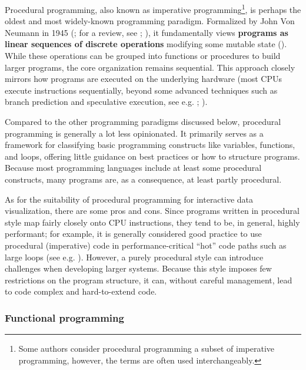 \documentclass[
  openany]{book}
\theoremstyle{definition}
\theoremstyle{definition}
\theoremstyle{definition}
\theoremstyle{definition}
\theoremstyle{remark}
\begin{document}
Procedural programming, also known as imperative programming\footnote{Some authors consider procedural programming a subset of imperative programming, however, the terms are often used interchangeably.}, is perhaps the oldest and most widely-known programming paradigm. Formalized by John Von Neumann in 1945 (; for a review, see ; ), it fundamentally views \textbf{programs as linear sequences of discrete operations} modifying some mutable state (). While these operations can be grouped into functions or procedures to build larger programs, the core organization remains sequential. This approach closely mirrors how programs are executed on the underlying hardware (most CPUs execute instructions sequentially, beyond some advanced techniques such as branch prediction and speculative execution, see e.g. ; ).

Compared to the other programming paradigms discussed below, procedural programming is generally a lot less opinionated. It primarily serves as a framework for classifying basic programming constructs like variables, functions, and loops, offering little guidance on best practices or how to structure programs. Because most programming languages include at least some procedural constructs, many programs are, as a consequence, at least partly procedural.

As for the suitability of procedural programming for interactive data visualization, there are some pros and cons. Since programs written in procedural style map fairly closely onto CPU instructions, they tend to be, in general, highly performant; for example, it is generally considered good practice to use procedural (imperative) code in performance-critical ``hot'' code paths such as large loops (see e.g. ). However, a purely procedural style can introduce challenges when developing larger systems. Because this style imposes few restrictions on the program structure, it can, without careful management, lead to code complex and hard-to-extend code.

\subsubsection{Functional programming}\label{functional}
\end{document}

